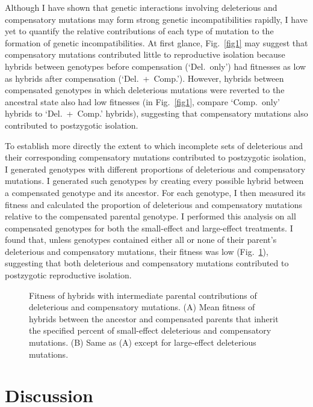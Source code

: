 \begin{doublespace}
Although I have shown that genetic interactions
involving deleterious and compensatory mutations
may form strong genetic incompatibilities rapidly,
I have yet to quantify the relative contributions
of each type of mutation to the formation of genetic incompatibilities.
%
At first glance, Fig.~\ref{fig1}
may suggest that compensatory mutations
contributed little to reproductive isolation
because hybrids between genotypes before compensation (`Del.~only')
had fitnesses as low as hybrids after compensation (`Del.~+~Comp.').
%
However, hybrids between compensated genotypes in which deleterious mutations
were reverted to the ancestral state also had low fitnesses
(in Fig.~\ref{fig1}, compare `Comp.~only' hybrids to `Del.~+~Comp.' hybrids),
suggesting that compensatory mutations
also contributed to postzygotic isolation.



To establish more directly the extent to which incomplete sets
of deleterious and their corresponding compensatory mutations
contributed to postzygotic isolation,
I generated genotypes with different proportions
of deleterious and compensatory mutations.
%
I generated such genotypes by creating every possible hybrid
between a compensated genotype and its ancestor.
%
For each genotype, I then measured its fitness and calculated
the proportion of deleterious and compensatory mutations
relative to the compensated parental genotype.
%
I performed this analysis on all compensated genotypes
for both the small-effect and large-effect treatments.
%
I found that, unless genotypes contained either
all or none of their parent's deleterious and compensatory mutations,
their fitness was low (Fig.~\ref{fig3}),
suggesting that both deleterious and compensatory mutations
contributed to postzygotic reproductive isolation.



\begin{figure}
\centering
\caption{Fitness of hybrids with intermediate parental contributions
  of deleterious and compensatory mutations.
  (A) Mean fitness of hybrids between the ancestor
  and compensated parents that inherit the specified percent of small-effect
  deleterious and compensatory mutations. (B) Same as (A) except for
  large-effect deleterious mutations.}
\label{fig3}
\end{figure}



\section{Discussion}


\end{doublespace}

